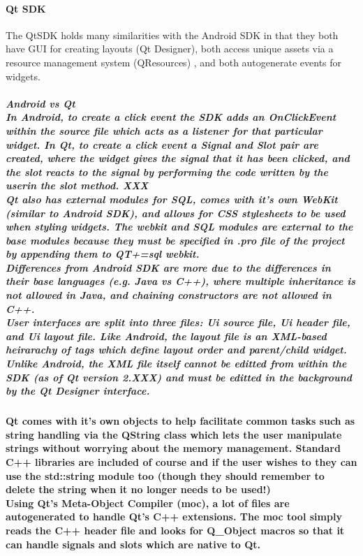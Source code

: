 \documentclass[11pt]{article} %
\begin{document}
\paragraph{Qt SDK}{ 
The QtSDK holds many similarities with the Android SDK in that they both have GUI for creating layouts (Qt Designer), both access unique assets via a resource management system (QResources) , and both autogenerate events for widgets. 
}
\subparagraph{Android vs Qt\\
In Android, to create a click event the SDK adds an OnClickEvent within the source file which acts as a listener for that particular widget. In Qt, to create a click event a Signal and Slot pair are created, where the widget gives the signal that it has been clicked, and the slot reacts to the signal by performing the code written by the userin the slot method. XXX
\\
Qt also has external modules for SQL, comes with it's own WebKit (similar to Android SDK), and allows for CSS stylesheets to be used when styling widgets. The webkit and SQL modules are external to the base modules because they must be specified in .pro file of the project by appending them to QT+=sql webkit.
\\
Differences from Android SDK are more due to the differences in their base languages (e.g. Java vs C++), where multiple inheritance is not allowed in Java, and chaining constructors are not allowed in C++.\\
User interfaces are split into three files: Ui source file, Ui header file, and Ui layout file. Like Android, the layout file is an XML-based heirarachy of tags which define layout order and parent/child widget. Unlike Android, the XML file itself cannot be editted from within the SDK (as of Qt version 2.XXX) and must be editted in the background by the Qt Designer interface.
}
\paragraph{
Qt comes with it's own objects to help facilitate common tasks such as string handling via the QString class which lets the user manipulate strings without worrying about the memory management. Standard C++ libraries are included of course and if the user wishes to they can use the std::string module too (though they should remember to delete the string when it no longer needs to be used!)
\\Using Qt's Meta-Object Compiler (moc), a lot of files are autogenerated to handle Qt's C++ extensions. The moc tool simply reads the C++ header file and looks for Q\_Object macros so that it can handle signals and slots which are native to Qt.
}
\end{document}
